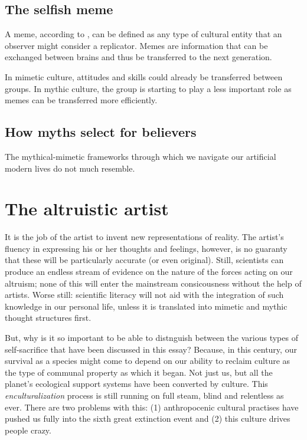 \documentclass{article}
\begin{document}
\subsection{The selfish meme}
\label{sec:memes}

A meme, according to \citet{dawkins1976}, can be defined as any type of
cultural entity that an observer might consider a replicator.  Memes are
information that can be exchanged between brains and thus be transferred to the
next generation.

In mimetic culture, attitudes and skills could already be transferred between groups.
In mythic culture, the group is starting to play a less important role as memes can be transferred more efficiently.

\subsection{How myths select for believers}

The mythical-mimetic frameworks through which we navigate our artificial modern
lives do not much resemble.

\section{The altruistic artist}

It is the job of the artist to invent new representations of reality. The artist's
fluency in expressing his or her thoughts and feelings, however, is no guaranty
that these will be particularly accurate (or even original). Still, scientists can
produce an endless stream of evidence on the nature of the forces acting on our
altruism; none of this will enter the mainstream consicousness without the help of
artists. Worse still: scientific literacy will not aid with the integration of such
knowledge in our personal life, unless it is translated into mimetic and mythic
thought structures first.

But, why is it so important to be able to distnguish between the various types
of self-sacrifice that have been discussed in this essay? Because, in this century,
our survival as a species might come to depend on our ability to reclaim culture
as the type of communal property as which it began. Not just us, but all the
planet's ecological support systems have been converted by culture. This
\textit{enculturalization} process is still running on full steam, blind and
relentless as ever. There are two problems with this: (1) anthropocenic
cultural practises have pushed us fully into the sixth great extinction event
and (2) this culture drives people crazy.
\end{document}
